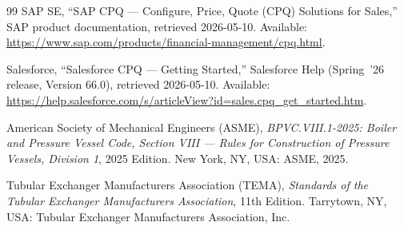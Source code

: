 \begin{thebibliography}{99}
SAP SE, ``SAP CPQ --- Configure, Price, Quote (CPQ) Solutions for Sales,''
SAP product documentation, retrieved 2026-05-10. Available:
\url{https://www.sap.com/products/financial-management/cpq.html}.

Salesforce, ``Salesforce CPQ --- Getting Started,'' Salesforce Help
(Spring~'26 release, Version 66.0), retrieved 2026-05-10. Available:
\url{https://help.salesforce.com/s/articleView?id=sales.cpq_get_started.htm}.


American Society of Mechanical Engineers (ASME), \emph{BPVC.VIII.1-2025: Boiler
and Pressure Vessel Code, Section VIII --- Rules for Construction of Pressure
Vessels, Division 1}, 2025 Edition. New York, NY, USA: ASME, 2025.

Tubular Exchanger Manufacturers Association (TEMA), \emph{Standards of the
Tubular Exchanger Manufacturers Association}, 11th Edition. Tarrytown, NY, USA:
Tubular Exchanger Manufacturers Association, Inc.

\end{thebibliography}
